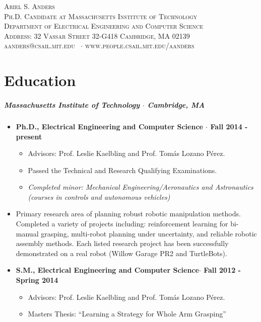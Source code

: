 \documentclass[10pt,letterpaper]{article}
\newcommand{\namestyle}{\Huge \scshape}
\newcommand{\deptstyle}{\footnotesize \rmfamily \scshape}
\newcommand{\addressstyle}{\footnotesize \rmfamily \upshape}
\begin{document}
\begin{center}
\namestyle Ariel S. Anders \\[0.3em]
\deptstyle Ph.D. Candidate  at  Massachusetts Institute of Technology \\Department of Electrical Engineering and Computer Science\\[0.2em]
\addressstyle Address: 32 Vassar Street 32-G418 Cambridge, MA 02139\\
    aanders@csail.mit.edu \ $\cdot$ www.people.csail.mit.edu/aanders
\end{center}

\section*{Education}
 \subparagraph{Massachusetts Institute of Technology $\cdot$ Cambridge, MA}

\begin{itemize}
    \item {\bf Ph.D., Electrical Engineering and Computer Science $\cdot$ Fall 2014 - present}
 	\begin{itemize}
        \item Advisors: Prof. Leslie Kaelbling and Prof. Tom\'as Lozano P\'erez.
        \item Passed the Technical and Research Qualifying Examinations.
        \item {\em Completed minor: Mechanical Engineering/Aeronautics and Astronautics\\
                (courses in controls and autonomous vehicles)}
	\end{itemize}
\item Primary research area of planning robust robotic manipulation methods. Completed a variety of projects including: reinforcement learning for bi-manual grasping, multi-robot planning under uncertainty, and reliable robotic assembly methods. Each listed research project has been successfully demonstrated on a real robot (Willow Garage PR2 and TurtleBots).   
\end{itemize}

\begin{itemize}
 	\item {\bf S.M., Electrical Engineering and Computer Science$\cdot$ Fall 2012 - Spring 2014}
    \begin{itemize}
	    \item Advisors: Prof. Leslie Kaelbling and Prof. Tom\'as Lozano P\'erez.
	    \item Masters Thesis: ``Learning a Strategy for Whole Arm Grasping''
	\end{itemize}
\end{itemize}
\end{document}
